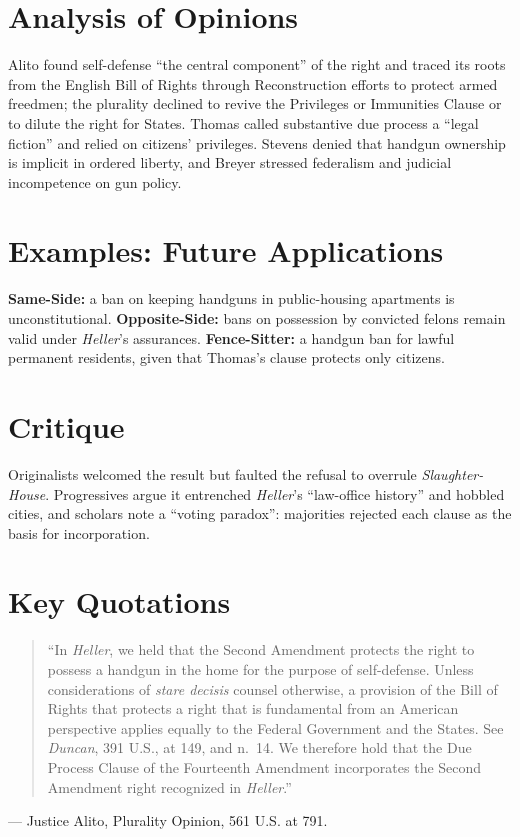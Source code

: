 \documentclass[12pt]{article}
\begin{document}
\section{Analysis of Opinions}
Alito found self-defense ``the central component'' of the right and traced its roots from the English Bill of Rights through Reconstruction efforts to protect armed freedmen; the plurality declined to revive the Privileges or Immunities Clause or to dilute the right for States. Thomas called substantive due process a ``legal fiction'' and relied on citizens' privileges. Stevens denied that handgun ownership is implicit in ordered liberty, and Breyer stressed federalism and judicial incompetence on gun policy.

\section{Examples: Future Applications}
\textbf{Same-Side:} a ban on keeping handguns in public-housing apartments is unconstitutional. \textbf{Opposite-Side:} bans on possession by convicted felons remain valid under \textit{Heller}'s assurances. \textbf{Fence-Sitter:} a handgun ban for lawful permanent residents, given that Thomas's clause protects only citizens.

\section{Critique}
Originalists welcomed the result but faulted the refusal to overrule \textit{Slaughter-House}. Progressives argue it entrenched \textit{Heller}'s ``law-office history'' and hobbled cities, and scholars note a ``voting paradox'': majorities rejected each clause as the basis for incorporation.

\section{Key Quotations}
\begin{quote}
``In \textit{Heller}, we held that the Second Amendment protects the right to possess a handgun in the home for the purpose of self-defense. Unless considerations of \textit{stare decisis} counsel otherwise, a provision of the Bill of Rights that protects a right that is fundamental from an American perspective applies equally to the Federal Government and the States. See \textit{Duncan}, 391 U.S., at 149, and n.~14. We therefore hold that the Due Process Clause of the Fourteenth Amendment incorporates the Second Amendment right recognized in \textit{Heller}.''
\end{quote}
\noindent --- Justice Alito, Plurality Opinion, 561 U.S. at 791.
\end{document}
